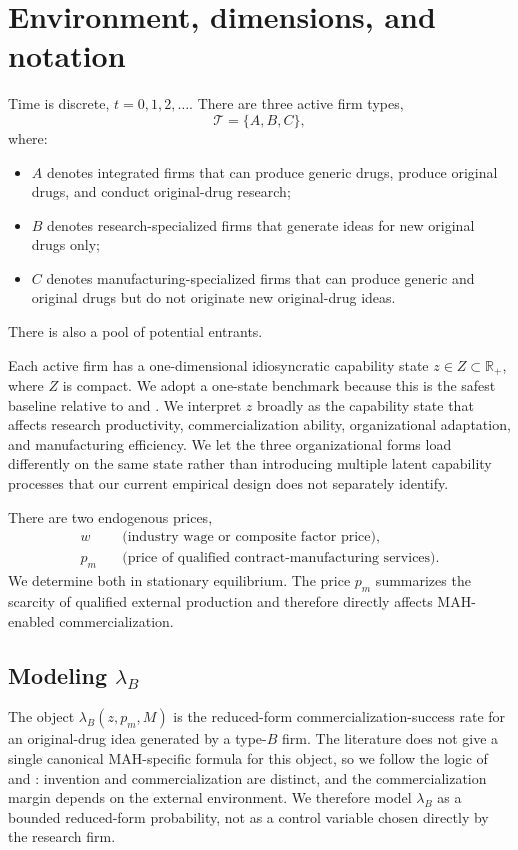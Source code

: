 \documentclass[12pt]{article}
\newcommand{\R}{\mathbb{R}}
\newcommand{\1}{\mathbf{1}}
\newcommand{\Tset}{\mathcal{T}}
\begin{document}
\section{Environment, dimensions, and notation}

Time is discrete, $t=0,1,2,\dots$. There are three active firm types,
\[
\Tset = \{A,B,C\},
\]
where:
\begin{itemize}[leftmargin=2em]
    \item $A$ denotes integrated firms that can produce generic drugs, produce original drugs, and conduct original-drug research;
    \item $B$ denotes research-specialized firms that generate ideas for new original drugs only;
    \item $C$ denotes manufacturing-specialized firms that can produce generic and original drugs but do not originate new original-drug ideas.
\end{itemize}
There is also a pool of potential entrants.

Each active firm has a one-dimensional idiosyncratic capability state $z\in Z\subset\R_+$, where $Z$ is compact. We adopt a one-state benchmark because this is the safest baseline relative to \citet{Hopenhayn1992} and \citet{Jovanovic1982}. We interpret $z$ broadly as the capability state that affects research productivity, commercialization ability, organizational adaptation, and manufacturing efficiency. We let the three organizational forms load differently on the same state rather than introducing multiple latent capability processes that our current empirical design does not separately identify.

There are two endogenous prices,
\[
\begin{aligned}
w &\quad \text{(industry wage or composite factor price)},\\
p_m &\quad \text{(price of qualified contract-manufacturing services)}.
\end{aligned}
\]
We determine both in stationary equilibrium. The price $p_m$ summarizes the scarcity of qualified external production and therefore directly affects MAH-enabled commercialization.

\subsection{Modeling \texorpdfstring{$\lambda_B$}{lambda B}}

The object $\lambda_B(z,p_m,M)$ is the reduced-form commercialization-success rate for an original-drug idea generated by a type-$B$ firm. The literature does not give a single canonical MAH-specific formula for this object, so we follow the logic of \citet{GansStern2003} and \citet{FonsRosenRoldanBlancoSchmitz2026}: invention and commercialization are distinct, and the commercialization margin depends on the external environment. We therefore model $\lambda_B$ as a bounded reduced-form probability, not as a control variable chosen directly by the research firm.
\end{document}
